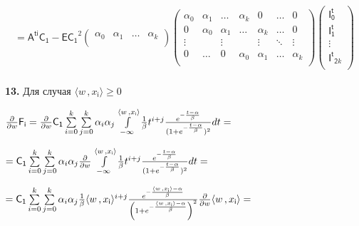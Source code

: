\documentclass[a4paper,12pt]{article}
\begin{document}
\begin{displaymath}
    = \mathsf{A^{ti}}\mathsf{C_1} - \mathsf{E} \mathsf{C_1}^2 \begin{pmatrix}
        \alpha_0 & \alpha_1 & \ldots & \alpha_k \\
    \end{pmatrix} \begin{pmatrix}
        \alpha_0 & \alpha_1 & \ldots & \alpha_k & 0 & \ldots & 0 \\
        0 & \alpha_0 & \alpha_1 & \ldots & \alpha_k & \ldots & 0 \\
        \vdots &  & \vdots &  & \vdots & \ddots & \vdots\\
        0 & \ldots & 0 & \alpha_0 & \alpha_1 &\ldots & \alpha_k \\
    \end{pmatrix} \begin{pmatrix}
        \mathsf{I^t_0} \\ \mathsf{I^t_1} \\ \vdots \\ \mathsf{I^t}_{\mathsf{2}k} \\
    \end{pmatrix}
\end{displaymath}\\

\noindent\textbf{13.} Для случая $\langle w \,, x_{\mathsf{i}}\rangle \geq{0}$

\begin{center}
    ${\partial\over{\partial w}} \mathsf{F_i} = {\partial\over{\partial w}} \mathsf{C_1} \sum\limits_{i = 0}^k \sum\limits_{j = 0}^k \alpha_i \alpha_j \int\limits_{-\infty}^{\langle w \,, x_{\mathsf{i}}\rangle} {1\over{\beta}} t^{i + j} {e^{-{t - \alpha\over{\beta}}}\over{(1 + e^{-{t - \alpha\over{\beta}}}})^2} d t = $
\end{center}

\begin{center}
    $= \mathsf{C_1} \sum\limits_{i = 0}^k \sum\limits_{j = 0}^k \alpha_i \alpha_j {\partial\over{\partial w}} \int\limits_{-\infty}^{\langle w \,, x_{\mathsf{i}}\rangle} {1\over{\beta}} t^{i + j} {e^{-{t - \alpha\over{\beta}}}\over{(1 + e^{-{t - \alpha\over{\beta}}}})^2} d t = $
\end{center}

\begin{center}
    $= \mathsf{C_1} \sum\limits_{i = 0}^k \sum\limits_{j = 0}^k \alpha_i \alpha_j  {1\over{\beta}} \langle w \,, x_{\mathsf{i}}\rangle^{i + j} {e^{-{\langle w \,, x_{\mathsf{i}}\rangle - \alpha\over{\beta}}}\over{\left(1 + e^{-{\langle w \,, x_{\mathsf{i}}\rangle - \alpha\over{\beta}}}\right)^2}} {\partial\over{\partial w}} \langle w \,, x_{\mathsf{i}}\rangle = $
\end{center}
\end{document}
